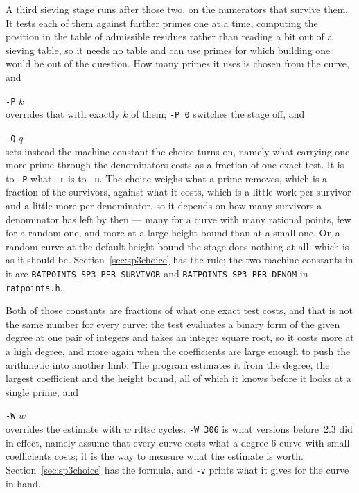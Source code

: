 \documentclass[12pt,a4paper,oneside]{amsart}
\begin{document}
A third sieving stage runs after those two, on the numerators that survive
them. It tests each of them against further primes one at a time, computing
the position in the table of admissible residues rather than reading a bit
out of a sieving table, so it needs no table and can use primes for which
building one would be out of the question. How many primes it uses is
chosen from the curve, and \\
\strut\quad\verb+-P+ $k$ \\
overrides that with exactly $k$ of them; \verb+-P 0+ switches the stage off,
and \\
\strut\quad\verb+-Q+ $q$ \\
sets instead the machine constant the choice turns on, namely what carrying
one more prime through the denominators costs as a fraction of one exact
test. It is to \verb+-P+ what \verb+-r+ is to \verb+-n+.
The choice weighs what a prime removes, which is a fraction of the survivors,
against what it costs, which is a little work per survivor and a little more
per denominator, so it depends on how many survivors a denominator has left
by then --- many for a curve with many rational points, few for a random one,
and more at a large height bound than at a small one. On a random curve at
the default height bound the stage does nothing at all, which is as it should
be. Section~\ref{sec:sp3choice} has the rule; the two machine constants in it
are \texttt{RATPOINTS\_SP3\_PER\_SURVIVOR} and
\texttt{RATPOINTS\_SP3\_PER\_DENOM} in \texttt{ratpoints.h}.

Both of those constants are fractions of what one exact test costs, and that
is not the same number for every curve: the test evaluates a binary form of
the given degree at one pair of integers and takes an integer square root, so
it costs more at a high degree, and more again when the coefficients are
large enough to push the arithmetic into another limb. The program estimates
it from the degree, the largest coefficient and the height bound, all of
which it knows before it looks at a single prime, and \\
\strut\quad\verb+-W+ $w$ \\
overrides the estimate with $w$ rdtsc cycles. \verb+-W 306+ is what versions
before~2.3 did in effect, namely assume that every curve costs what a
degree-6 curve with small coefficients costs; it is the way to measure what
the estimate is worth. Section~\ref{sec:sp3choice} has the formula, and
\verb+-v+ prints what it gives for the curve in hand.
\end{document}
